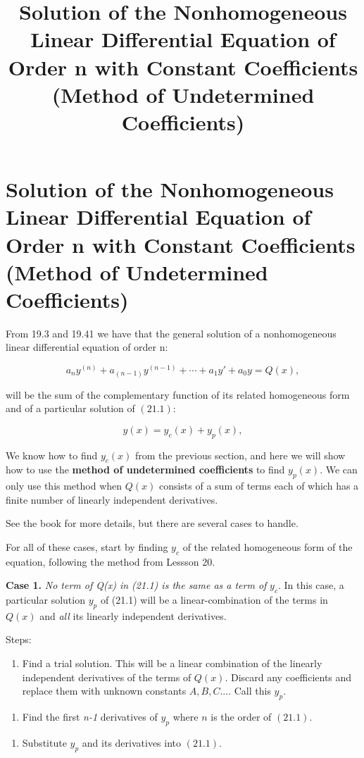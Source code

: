 \documentclass{article}
\title{Solution of the Nonhomogeneous Linear Differential Equation of Order n with Constant Coefficients (Method of Undetermined Coefficients)}
\begin{document}
\section{Solution of the Nonhomogeneous Linear Differential Equation of Order n with Constant Coefficients (Method of Undetermined Coefficients)}

From 19.3 and 19.41 we have that the general solution of a nonhomogeneous linear differential equation of order n:

\[ \tag{21.1} a_ny^{(n)} + a_{(n-1)}y^{(n-1)} + \cdots + a_1y' + a_0y = Q(x), \]

will be the sum of the complementary function of its related homogeneous form and of a particular solution of $(21.1)$:

\[ \tag{21.11} y(x) = y_c(x) + y_p(x), \]

We know how to find $y_c(x)$ from the previous section, and here we will show how to use the \textbf{method of undetermined coefficients} to find $y_p(x)$. We can only use this method when $Q(x)$ consists of a sum of terms each of which has a finite number of linearly independent derivatives.

See the book for more details, but there are several cases to handle.

For all of these cases, start by finding $y_c$ of the related homogeneous form of the equation, following the method from Lessson 20.

\textbf{Case 1.}  \emph{No term of Q(x) in (21.1) is the same as a term of} $y_c$. In this case, a particular solution $y_p$ of (21.1) will be a \@{linear-combination} of the terms in $Q(x)$ and \emph{all} its linearly independent derivatives.

Steps:

\begin{enumerate}
\item Find a trial solution. This will be a linear combination of the linearly independent derivatives of the terms of $Q(x)$. Discard any coefficients and replace them with unknown constants $A, B, C...$. Call this $y_p$.
\end{enumerate}

\begin{enumerate}
\item Find the first \emph{n-1} derivatives of $y_p$ where $n$ is the order of $(21.1)$.
\end{enumerate}

\begin{enumerate}
\item Substitute $y_p$ and its derivatives into $(21.1)$.
\end{enumerate}
\end{document}
